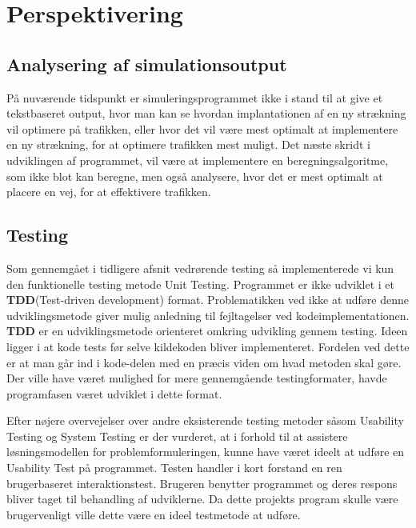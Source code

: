 \chapter{Perspektivering}\label{Perspektivering}
\section{Analysering af simulationsoutput}
På nuværende tidspunkt er simuleringsprogrammet ikke i stand til at give et tekstbaseret output, hvor man kan se hvordan implantationen af en ny strækning vil optimere på trafikken, eller hvor det vil være mest optimalt at implementere en ny strækning, for at optimere trafikken mest muligt. Det næste skridt i udviklingen af programmet, vil være at implementere en beregningsalgoritme, som ikke blot kan beregne, men også analysere, hvor det er mest optimalt at placere en vej, for at effektivere trafikken.
\section{Testing}
Som gennemgået i tidligere afsnit vedrørende testing så implementerede vi kun den funktionelle testing metode Unit Testing. Programmet er ikke udviklet i et \textbf{TDD}(Test-driven development) format. Problematikken ved ikke at udføre denne udviklingsmetode giver mulig anledning til fejltagelser ved kodeimplementationen. \textbf{TDD} er en udviklingsmetode orienteret omkring udvikling gennem testing. Ideen ligger i at kode tests før selve kildekoden bliver implementeret. Fordelen ved dette er at man går ind i kode-delen med en præcis viden om hvad metoden skal gøre.\cite{unittestbenefits}
Der ville have været mulighed for mere gennemgående testingformater, havde programfasen været udviklet i dette format.

\vspace{5mm}

Efter nøjere overvejelser over andre eksisterende testing metoder såsom Usability Testing og System Testing er der vurderet, at i forhold til at assistere løsningsmodellen for problemformuleringen, kunne have været ideelt at udføre en Usability Test på programmet. Testen handler i kort forstand en ren brugerbaseret interaktionstest. Brugeren benytter programmet og deres respons bliver taget til behandling af udviklerne.\cite{usability} Da dette projekts program skulle være brugervenligt ville dette være en ideel testmetode at udføre.